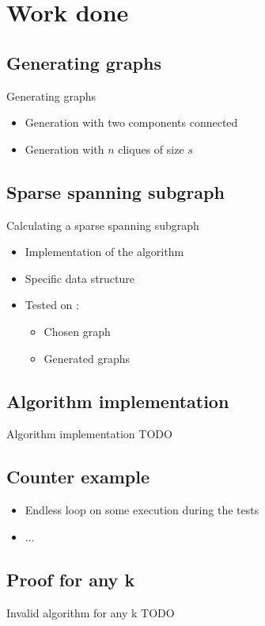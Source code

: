 \section{Work done}

\subsection{Generating graphs}
\begin{frame}{Generating graphs}
  \begin{itemize}
  \item Generation with two components connected
  \item Generation with $n$ cliques of size $s$
  \end{itemize}
\end{frame}

\subsection{Sparse spanning subgraph}
\begin{frame}{Calculating a sparse spanning subgraph}
  \begin{itemize}
  \item Implementation of the algorithm
  \item Specific data structure
  \item Tested on :
    \begin{itemize}
    \item Chosen graph
    \item Generated graphs
    \end{itemize}
  \end{itemize}
\end{frame}

\subsection{Algorithm implementation}
\begin{frame}{Algorithm implementation}
  TODO
\end{frame}

\subsection{Counter example}
\begin{frame}
  \begin{itemize}
  \item Endless loop on some execution during the tests
  \item ...
  \end{itemize}
\end{frame}


\subsection{Proof for any k}
\begin{frame}{Invalid algorithm for any k}
  TODO
\end{frame}
